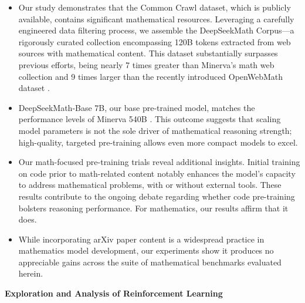 \begin{itemize}[topsep=0pt]
    \item Our study demonstrates that the Common Crawl dataset, which is publicly available, contains significant mathematical resources. Leveraging a carefully engineered data filtering process, we assemble the DeepSeekMath Corpus—a rigorously curated collection encompassing 120B tokens extracted from web sources with mathematical content. This dataset substantially surpasses previous efforts, being nearly 7 times greater than Minerva’s math web collection \citep{minerva} and 9 times larger than the recently introduced OpenWebMath dataset \citep{openwebmath}.

    \item DeepSeekMath-Base 7B, our base pre-trained model, matches the performance levels of Minerva 540B \citep{minerva}. This outcome suggests that scaling model parameters is not the sole driver of mathematical reasoning strength; high-quality, targeted pre-training allows even more compact models to excel.

    \item Our math-focused pre-training trials reveal additional insights. Initial training on code prior to math-related content notably enhances the model’s capacity to address mathematical problems, with or without external tools. These results contribute to the ongoing debate regarding whether code pre-training bolsters reasoning performance. For mathematics, our results affirm that it does.

    \item While incorporating arXiv paper content is a widespread practice in mathematics model development, our experiments show it produces no appreciable gains across the suite of mathematical benchmarks evaluated herein.
\end{itemize}

\textbf{Exploration and Analysis of Reinforcement Learning}

